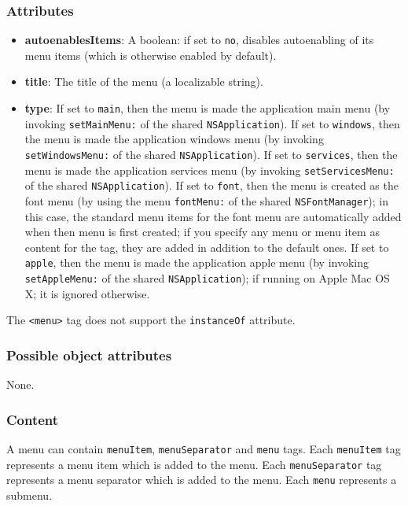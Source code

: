 \subsubsection{Attributes}
\begin{itemize}
\item {\bf autoenablesItems}: A boolean: if set to \texttt{no},
  disables autoenabling of its menu items (which is otherwise enabled
  by default).
\item {\bf title}: The title of the menu (a localizable string).
\item {\bf type}: If set to \texttt{main}, then the menu is made the
  application main menu (by invoking \texttt{setMainMenu:} of the
  shared \texttt{NSApplication}).  If set to \texttt{windows}, then
  the menu is made the application windows menu (by invoking
  \texttt{setWindowsMenu:} of the shared \texttt{NSApplication}).  If
  set to \texttt{services}, then the menu is made the application
  services menu (by invoking \texttt{setServicesMenu:} of the shared
  \texttt{NSApplication}).  If set to \texttt{font}, then the menu is
  created as the font menu (by using the menu \texttt{fontMenu:} of
  the shared \texttt{NSFontManager}); in this case, the standard menu
  items for the font menu are automatically added when then menu is
  first created; if you specify any menu or menu item as content for
  the tag, they are added in addition to the default ones.  If set to
  \texttt{apple}, then the menu is made the application apple menu (by
  invoking \texttt{setAppleMenu:} of the shared
  \texttt{NSApplication}); if running on Apple Mac OS X; it is ignored
  otherwise.
\end{itemize}

The \texttt{<menu>} tag does not support the \texttt{instanceOf} attribute.

\subsubsection{Possible object attributes}
None.

\subsubsection{Content}
A menu can contain \texttt{menuItem}, \texttt{menuSeparator} and
\texttt{menu} tags.  Each \texttt{menuItem} tag represents a menu item
which is added to the menu.  Each \texttt{menuSeparator} tag
represents a menu separator which is added to the menu.  Each
\texttt{menu} represents a submenu.

